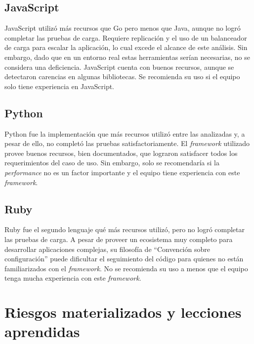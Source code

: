 \documentclass[11pt]{article}
\let\Oldsection\section
\renewcommand{\section}{\FloatBarrier\Oldsection}
\let\Oldsubsection\subsection
\renewcommand{\subsection}{\FloatBarrier\Oldsubsection}
\newcommand{\english}[1]{\textit{#1}}
\begin{document}
\subsection{JavaScript}
JavaScript utilizó más recursos que Go pero menos que Java, aunque no logró completar las pruebas de carga. Requiere replicación y el uso de un balanceador de carga para escalar la aplicación, lo cual excede el alcance de este análisis. Sin embargo, dado que en un entorno real estas herramientas serían necesarias, no se considera una deficiencia. JavaScript cuenta con buenos recursos, aunque se detectaron carencias en algunas bibliotecas. Se recomienda su uso si el equipo solo tiene experiencia en JavaScript.

\subsection{Python}
Python fue la implementación que más recursos utilizó entre las analizadas y, a pesar de ello, no completó las pruebas satisfactoriamente. El \english{framework} utilizado provee buenos recursos, bien documentados, que lograron satisfacer todos los requerimientos del caso de uso. Sin embargo, solo se recomendaría si la \english{performance} no es un factor importante y el equipo tiene experiencia con este \english{framework}.

\subsection{Ruby}
Ruby fue el segundo lenguaje qué más recursos utilizó, pero no logró completar las pruebas de carga. A pesar de proveer un ecosistema muy completo para desarrollar aplicaciones complejas, su filosofía de ``Convención sobre configuración'' puede dificultar el seguimiento del código para quienes no están familiarizados con el \textit{framework}. No se recomienda su uso a menos que el equipo tenga mucha experiencia con este \english{framework}.

\newpage

\section{Riesgos materializados y lecciones aprendidas}
\end{document}
